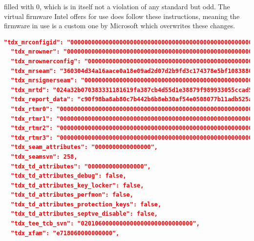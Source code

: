 filled with 0, which is in itself not a violation of any standard but odd. The virtual firmware Intel offers for use does follow these instructions, meaning the firmware in use is a custom one by Microsoft which overwrites these changes.
\begin{lstlisting}[language=json]
  "tdx_mrconfigid": "000000000000000000000000000000000000000000000000000000000000000000000000000000000000000000000000",
  "tdx_mrowner": "000000000000000000000000000000000000000000000000000000000000000000000000000000000000000000000000",
  "tdx_mrownerconfig": "000000000000000000000000000000000000000000000000000000000000000000000000000000000000000000000000",
  "tdx_mrseam": "360304d34a16aace0a18e09ad2d07d2b9fd3c174378e5bf108388079827f89ff62acc5f8c473dd40706324834e202946",
  "tdx_mrsignerseam": "000000000000000000000000000000000000000000000000000000000000000000000000000000000000000000000000",
  "tdx_mrtd": "024a32b070383331181619fa387cb4d55d1e38879f989933055ccad5bc2db795d1737b66205949d15469dc8c1ba7ab7b",
  "tdx_report_data": "c90f98ba8ab80c7b442b6b8eb30af54e0508077b11adb525af6dfbcc8714e52a0000000000000000000000000000000000000000000000000000000000000000",
  "tdx_rtmr0": "000000000000000000000000000000000000000000000000000000000000000000000000000000000000000000000000",
  "tdx_rtmr1": "000000000000000000000000000000000000000000000000000000000000000000000000000000000000000000000000",
  "tdx_rtmr2": "000000000000000000000000000000000000000000000000000000000000000000000000000000000000000000000000",
  "tdx_rtmr3": "000000000000000000000000000000000000000000000000000000000000000000000000000000000000000000000000",
  "tdx_seam_attributes": "0000000000000000",
  "tdx_seamsvn": 258,
  "tdx_td_attributes": "0000000000000000",
  "tdx_td_attributes_debug": false,
  "tdx_td_attributes_key_locker": false,
  "tdx_td_attributes_perfmon": false,
  "tdx_td_attributes_protection_keys": false,
  "tdx_td_attributes_septve_disable": false,
  "tdx_tee_tcb_svn": "02010600000000000000000000000000",
  "tdx_xfam": "e718060000000000",
\end{lstlisting}
